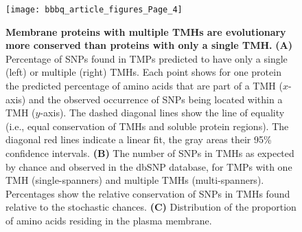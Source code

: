 \documentclass[utf8]{frontiersSCNS} %
\begin{document}
%
%
\begin{figure}[h!]
\begin{center}
\texttt{[image: bbbq\_article\_figures\_Page\_4]}%
\end{center}
\caption{\textbf{Membrane proteins with multiple TMHs are evolutionary more conserved than proteins with only a single TMH.}
      \textbf{(A)} 
      Percentage of SNPs found in TMPs predicted to have only a single
      (left) or multiple (right) TMHs.
      Each point shows for one protein the predicted percentage of amino acids that are part of a TMH ($x$-axis) and the observed occurrence of SNPs being located within a TMH ($y$-axis). The dashed diagonal lines show the line of equality (i.e., equal conservation of TMHs and soluble protein regions). 
      The diagonal red lines indicate a linear fit, the gray areas their 95\% confidence intervals.
      \textbf{(B)} 
      The number of SNPs in TMHs as expected by chance 
      and observed in the dbSNP database, 
      for TMPs with one TMH (single-spanners) and multiple TMHs (multi-spanners).
      Percentages show the relative conservation
      of SNPs in TMHs found relative to the stochastic chances.
      \textbf{(C)} 
      Distribution of the proportion of amino acids residing
      in the plasma membrane. 
}
\label{fig:4}
\end{figure}

\end{document}
